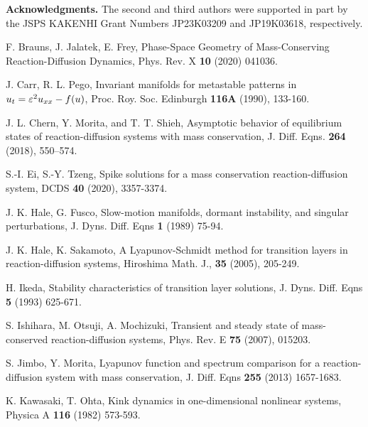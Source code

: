 \documentclass[a4,10pt]{article}
\begin{document}
\vspace{1cm}

{\bf Acknowledgments.} 
The second and third authors were supported 
in part by the JSPS KAKENHI Grant Numbers JP23K03209 and JP19K03618, respectively.

\vspace{1cm}


\begin{thebibliography}{99}


 F. Brauns, J. Jalatek, E. Frey, 
Phase-Space Geometry of Mass-Conserving Reaction-Diffusion Dynamics, 
Phys. Rev. X {\bf 10}  (2020) 041036.

 J. Carr, R. L. Pego,
Invariant manifolds for metastable patterns in $u_t = \varepsilon^2 u_{xx} - f(u)$,
Proc. Roy. Soc. Edinburgh {\bf 116A} (1990), 133-160.

 J. L. Chern, Y. Morita, and T. T. Shieh,
Asymptotic behavior of equilibrium states of reaction-diffusion systems 
with mass conservation,
J. Diff. Eqns. {\bf 264} (2018),  550--574.

S.-I. Ei, S.-Y. Tzeng,
Spike solutions for a mass conservation reaction-diffusion system,
DCDS {\bf 40} (2020), 3357-3374.

 J. K. Hale, G. Fusco,
Slow-motion manifolds, dormant instability, and singular perturbations,
J. Dyns. Diff. Eqns {\bf 1} (1989) 75-94.

J. K. Hale, K. Sakamoto,
A Lyapunov-Schmidt method for transition layers in reaction-diffusion 
systems,
Hiroshima Math. J., {\bf 35} (2005), 205-249.

 H. Ikeda, 
Stability characteristics of transition layer solutions,
J. Dyns. Diff. Eqns {\bf 5} (1993) 625-671.

 S. Ishihara, M. Otsuji, A. Mochizuki, 
Transient and steady state of mass-conserved reaction-diffusion systems,
Phys. Rev. E {\bf 75} (2007), 015203.  


 S. Jimbo, Y. Morita,  
Lyapunov function and spectrum comparison for a reaction-diffusion system with mass conservation, 
J. Diff. Eqns {\bf 255} (2013) 1657-1683. 

 K. Kawasaki, T. Ohta,
Kink dynamics in one-dimensional nonlinear systems,
Physica A {\bf 116} (1982) 573-593.


\end{thebibliography}
\end{document}
